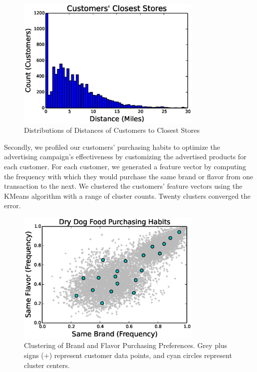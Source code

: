 \documentclass[conference]{IEEEtran}
\begin{document}
\begin{figure}[!t]
  \centering
  \includegraphics[width=3.5in]{figures/customer_store_distances.eps}
  \caption{Distributions of Distances of Customers to Closest Stores}
  \label{fig:cluster_analysis}
\end{figure}

Secondly, we profiled our customers' purchasing habits to optimize the advertising campaign's effectiveness by customizing the advertised products for each customer.  For each customer, we generated a feature vector by computing the frequency with which they would purchase the same brand or flavor from one transaction to the next.  We clustered the customers' feature vectors using the KMeans algorithm with a range of cluster counts. Twenty clusters converged the error.

\begin{figure}[!t]
  \centering
  \includegraphics[width=3.5in]{figures/cluster_analysis.eps}
  \caption{Clustering of Brand and Flavor Purchasing Preferences. Grey plus signs (+) represent customer data points, and cyan circles represent cluster centers.}
  \label{fig:cluster_analysis}
\end{figure}
\end{document}
